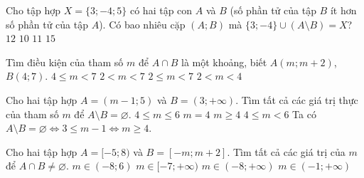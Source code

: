 \begin{ex}%
	Cho tập hợp $X=\{3;-4;5\}$ có hai tập con $A$ và $B$ (số phần tử của tập $B$ ít hơn số phần tử của tập $A$). Có bao nhiêu cặp $(A;B)$ mà $\{3;-4\}\cup (A\setminus B)=X$?
	\choice
	{$12$}
	{$10$}
	{\True $11$}
	{$15$}
\end{ex}
\begin{ex}%
	Tìm điều kiện của tham số $m$ để $A\cap B$ là một khoảng, biết $A ( m ; m + 2 )$, $B ( 4 ; 7 )$.
	\choice
	{$4 \leq m<7$}
	{\True $2<m<7$}
	{$2 \leq m<7$}
	{$2< m < 4$}
\end{ex}
\begin{ex}%
	Cho hai tập hợp $A=(m-1;5)$ và $B=(3;+\infty)$. Tìm tất cả các giá trị thực của tham số $m$ để $A\setminus B=\varnothing$.
	\choice
	{$4\leq m\leq 6$}
	{$m=4$}
	{\True $m\geq 4$}
	{$4\leq m<6$}
	\loigiai
	{Ta có $A\setminus B=\varnothing\Leftrightarrow 3\leq m-1\Leftrightarrow m\geq 4$.
	}
\end{ex}
\begin{ex}%
	Cho hai tập hợp $A=[-5;8)$ và $B=[-m;m+2]$. Tìm tất cả các giá trị của $m$ để $A \cap B \ne \varnothing$.
	\choice
	{$m\in(-8;6)$}
	{$m\in[-7;+\infty)$}
	{$m\in(-8;+\infty)$}
	{\True $m\in(-1;+\infty)$}
\end{ex}
